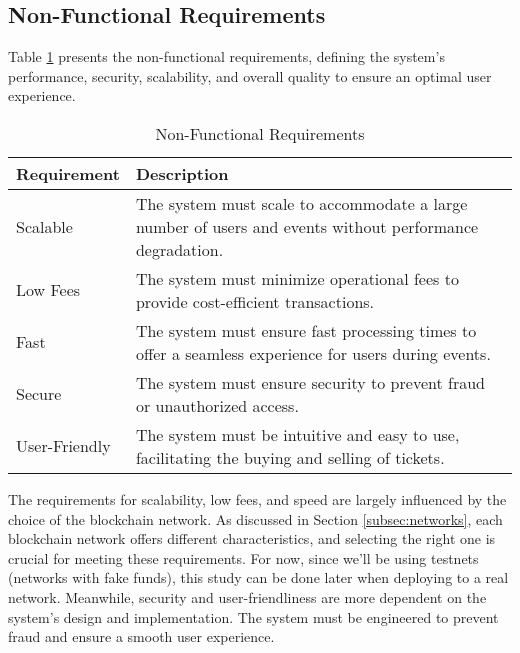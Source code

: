 \subsection{Non-Functional Requirements}
\label{subsec:non_functional_requirements}

Table \ref{tab:non_functional_requirements} presents the non-functional
requirements, defining the system's performance, security, scalability, and
overall quality to ensure an optimal user experience.

\begin{table}[H]
    \caption{Non-Functional Requirements}
    \centering
    \begin{tabularx}{\textwidth}{lX}
        \hline
        \textbf{Requirement} & \textbf{Description}                                                                                     \\
        \hline
        Scalable             & The system must scale to accommodate a large number of users and events without performance degradation. \\
        \hline
        Low Fees             & The system must minimize operational fees to provide cost-efficient transactions.                        \\
        \hline
        Fast                 & The system must ensure fast processing times to offer a seamless experience for users during events.     \\
        \hline
        Secure               & The system must ensure security to prevent fraud or unauthorized access.                                 \\
        \hline
        User-Friendly        & The system must be intuitive and easy to use, facilitating the buying and selling of tickets.            \\
        \hline
    \end{tabularx}
    \label{tab:non_functional_requirements}
\end{table}

The requirements for scalability, low fees, and speed are largely influenced by
the choice of the blockchain network. As discussed in Section
\ref{subsec:networks}, each blockchain network offers different
characteristics, and selecting the right one is crucial for meeting these
requirements. For now, since we'll be using testnets (networks with fake
funds), this study can be done later when deploying to a real network.
Meanwhile, security and user-friendliness are more dependent on the system's
design and implementation. The system must be engineered to prevent fraud and
ensure a smooth user experience.
